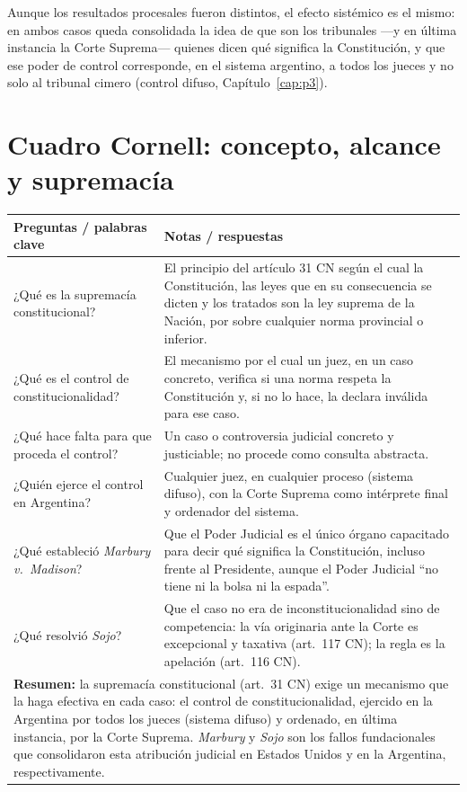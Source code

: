 \documentclass[12pt,oneside]{book}
\begin{document}
Aunque los resultados procesales fueron distintos, el efecto sistémico es el
mismo: en ambos casos queda consolidada la idea de que son los tribunales —y en
última instancia la Corte Suprema— quienes dicen qué significa la Constitución, y
que ese poder de control corresponde, en el sistema argentino, a todos los jueces
y no solo al tribunal cimero (control difuso, Capítulo~\ref{cap:p3}).

\section{Cuadro Cornell: concepto, alcance y supremacía}

\begin{longtable}{@{}p{}p{}@{}}
\toprule
\textbf{Preguntas / palabras clave} & \textbf{Notas / respuestas} \\
\midrule
\endhead
¿Qué es la supremacía constitucional? & El principio del artículo 31 CN según el
cual la Constitución, las leyes que en su consecuencia se dicten y los tratados
son la ley suprema de la Nación, por sobre cualquier norma provincial o inferior. \\
¿Qué es el control de constitucionalidad? & El mecanismo por el cual un juez, en
un caso concreto, verifica si una norma respeta la Constitución y, si no lo hace,
la declara inválida para ese caso. \\
¿Qué hace falta para que proceda el control? & Un caso o controversia judicial
concreto y justiciable; no procede como consulta abstracta. \\
¿Quién ejerce el control en Argentina? & Cualquier juez, en cualquier proceso
(sistema difuso), con la Corte Suprema como intérprete final y ordenador del
sistema. \\
¿Qué estableció \textit{Marbury v.\ Madison}? & Que el Poder Judicial es el único
órgano capacitado para decir qué significa la Constitución, incluso frente al
Presidente, aunque el Poder Judicial ``no tiene ni la bolsa ni la espada''. \\
¿Qué resolvió \textit{Sojo}? & Que el caso no era de inconstitucionalidad sino de
competencia: la vía originaria ante la Corte es excepcional y taxativa (art.\ 117
CN); la regla es la apelación (art.\ 116 CN). \\
\midrule
\multicolumn{2}{p{0.95\textwidth}}{\textbf{Resumen:} la supremacía constitucional
(art.\ 31 CN) exige un mecanismo que la haga efectiva en cada caso: el control de
constitucionalidad, ejercido en la Argentina por todos los jueces (sistema
difuso) y ordenado, en última instancia, por la Corte Suprema. \textit{Marbury} y
\textit{Sojo} son los fallos fundacionales que consolidaron esta atribución
judicial en Estados Unidos y en la Argentina, respectivamente.} \\
\bottomrule
\end{longtable}
\end{document}
